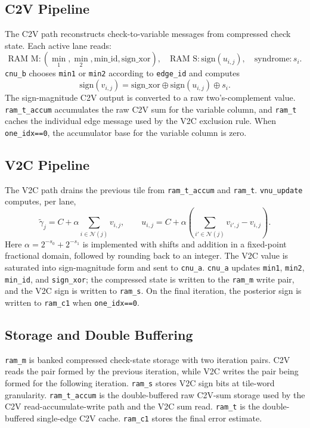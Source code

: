 \documentclass{article}
\begin{document}
\subsection{C2V Pipeline}

The C2V path reconstructs check-to-variable messages from compressed check
state. Each active lane reads:
\[
  \text{RAM M}: (\min_1,\min_2,\text{min\_id},\text{sign\_xor}),\quad
  \text{RAM S}: \text{sign}(u_{i,j}),\quad
  \text{syndrome}: s_i .
\]
\texttt{cnu\_b} chooses \texttt{min1} or \texttt{min2} according to
\texttt{edge\_id} and computes
\[
  \text{sign}(v_{i,j})=\text{sign\_xor}\oplus \text{sign}(u_{i,j})\oplus s_i .
\]
The sign-magnitude C2V output is converted to a raw two's-complement value.
\texttt{ram\_t\_accum} accumulates the raw C2V sum for the variable column, and
\texttt{ram\_t} caches the individual edge message used by the V2C exclusion
rule. When \texttt{one\_idx==0}, the accumulator base for the variable column is
zero.

\subsection{V2C Pipeline}

The V2C path drains the previous tile from \texttt{ram\_t\_accum} and
\texttt{ram\_t}. \texttt{vnu\_update} computes, per lane,
\[
  \tilde\gamma_j = C + \alpha\sum_{i\in\mathcal{N}(j)} v_{i,j},
  \qquad
  u_{i,j}=C+\alpha\left(\sum_{i'\in\mathcal{N}(j)}v_{i',j}-v_{i,j}\right).
\]
Here $\alpha=2^{-s_0}+2^{-s_1}$ is implemented with shifts and addition in a
fixed-point fractional domain, followed by rounding back to an integer.
The V2C value is saturated into sign-magnitude form and sent to \texttt{cnu\_a}.
\texttt{cnu\_a} updates \texttt{min1}, \texttt{min2}, \texttt{min\_id}, and
\texttt{sign\_xor}; the compressed state is written to the \texttt{ram\_m}
write pair, and the V2C sign is written to \texttt{ram\_s}. On the final
iteration, the posterior sign is written to \texttt{ram\_c1} when
\texttt{one\_idx==0}.

\subsection{Storage and Double Buffering}

\texttt{ram\_m} is banked compressed check-state storage with two iteration
pairs. C2V reads the pair formed by the previous iteration, while V2C writes the
pair being formed for the following iteration. \texttt{ram\_s} stores V2C sign
bits at tile-word granularity. \texttt{ram\_t\_accum} is the double-buffered raw
C2V-sum storage used by the C2V read-accumulate-write path and the V2C sum
read. \texttt{ram\_t} is the double-buffered single-edge C2V cache.
\texttt{ram\_c1} stores the final error estimate.
\end{document}
